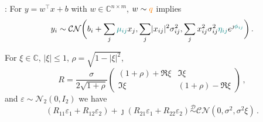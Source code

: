\documentclass{beamer}
\newcommand{\cplx}{\mathbb{C}}
\newcommand{\iu}{{\jmath}}
\begin{document}
\begin{frame}[c]{\insertsection: \insertsubsection}
  For $y = w^\top x + b$ with $w \in \cplx^{n \times m}$, $w \sim {\color{orange} q}$ implies
  \begin{equation*}
    y_i \sim \mathcal{CN}\biggl(
        b_i + \sum_j {\color{teal} \mu_{i j}} x_j,
        \sum_j \lvert x_{i j} \rvert^2 \sigma^2_{i j},
        \sum_j x_{i j}^2 \sigma^2_{i j}
        {\color{teal} \eta_{i j}} e^{\iu {\color{teal} \phi_{i j}}}
    \biggr)
    \,.
  \end{equation*}

  \pause
  \bigskip
  For $
    \xi \in \cplx
  $, $\lvert \xi \rvert \leq 1$, $
    \rho = \sqrt{1 - \lvert \xi \rvert^2}
  $,
  $$
    R = \frac\sigma{2 \sqrt{1 + \rho}} \begin{pmatrix}
        (1 + \rho) + \Re \xi & \Im \xi \\
        \Im \xi & (1 + \rho) - \Re \xi
      \end{pmatrix}
    \,, $$
  and $\varepsilon \sim \mathcal{N}_2(0, I_2)$ we have 
  $$
    (R_{11} \varepsilon_1 + R_{12} \varepsilon_2)
    + \iu (R_{21} \varepsilon_1 + R_{22} \varepsilon_2)
    \overset{\mathcal{D}}{\sim}
    \mathcal{CN}(0, \sigma^2, \sigma^2 \xi)
  \,. $$
\end{frame}



\end{document}
